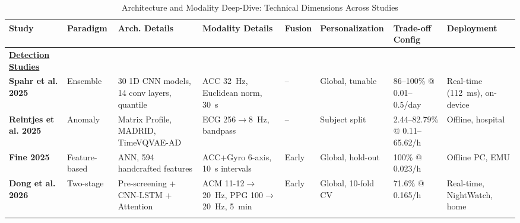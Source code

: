 
\begin{landscape}
\begin{table}[htbp]
\centering
\small
\caption{Architecture and Modality Deep-Dive: Technical Dimensions Across Studies}
\label{tab:detailed-metrics}
\setlength{\tabcolsep}{3.5pt}           %
\renewcommand{\arraystretch}{1.15}      %
\begin{tabularx}{\linewidth}{@{} l X X X X X X X @{}}
\toprule
\textbf{Study} & \textbf{Paradigm} & \textbf{Arch. Details} & \textbf{Modality Details} & \textbf{Fusion} & \textbf{Personalization} & \textbf{Trade-off Config} & \textbf{Deployment} \\
\midrule

\textbf{\underline{Detection Studies}} \\
\addlinespace

\textbf{Spahr et al. 2025} & Ensemble & 30 1D CNN models, 14 conv layers, quantile & ACC 32~Hz, Euclidean norm, 30~s & -- & Global, tunable & 86--100\% @ 0.01--0.5/day & Real-time (112~ms), on-device \\
\addlinespace

\textbf{Reintjes et al. 2025} & Anomaly & Matrix Profile, MADRID, TimeVQVAE-AD & ECG 256$\to$8~Hz, bandpass & -- & Subject split & 2.44--82.79\% @ 0.11--65.62/h & Offline, hospital \\
\addlinespace

\textbf{Fine 2025} & Feature-based & ANN, 594 handcrafted features & ACC+Gyro 6-axis, 10~s intervals & Early & Global, hold-out & 100\% @ 0.023/h & Offline PC, EMU \\
\addlinespace

\textbf{Dong et al. 2026} & Two-stage & Pre-screening + CNN-LSTM + Attention & ACM 11-12$\to$20~Hz, PPG 100$\to$20~Hz, 5~min & Early & Global, 10-fold CV & 71.6\% @ 0.165/h & Real-time, NightWatch, home \\
\addlinespace


\end{tabularx}
\end{table}
\end{landscape}
